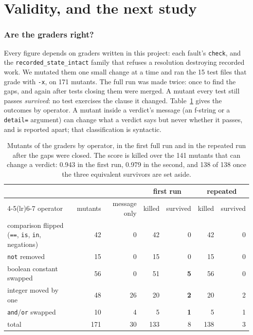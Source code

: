 \documentclass[11pt]{article}
\newcommand{\code}[1]{\texttt{#1}}
\begin{document}
\clearpage
\part{Validity, and the next study}

\section{Are the graders right?}
\label{sec:graders}

Every figure depends on graders written in this project: each fault's \code{check}, and the
\code{recorded\_state\_intact} family that refuses a resolution destroying recorded work. We
mutated them one small change at a time and ran the 15 test files that grade with \code{-x}, on
171 mutants. The full run was made twice: once to find the gaps, and again after tests closing
them were merged. A mutant every test still passes \emph{survived}: no test exercises the
clause it changed. Table~\ref{tab:mutation} gives the outcomes by operator. A mutant inside a
verdict's message (an f-string or a \code{detail=} argument) can change what a verdict says but
never whether it passes, and is reported apart; that classification is syntactic.

\begin{table}[t]
\centering
\caption{Mutants of the graders by operator, in the first full run and in the repeated run after
the gaps were closed. The score is killed over the 141 mutants that can change a verdict: 0.943
in the first run, 0.979 in the second, and 138 of 138 once the three equivalent survivors are set
aside.}
\label{tab:mutation}
\small
\setlength{\tabcolsep}{4pt}
\begin{tabular}{lrrrrrr}
\toprule
& & & \multicolumn{2}{c}{first run} & \multicolumn{2}{c}{repeated} \\
\cmidrule(lr){4-5}\cmidrule(lr){6-7}
operator & mutants & message only & killed & survived & killed & survived \\
\midrule
comparison flipped (\code{==}, \code{is}, \code{in}, negations) & 42 & 0 & 42 & 0 & 42 & 0 \\
\code{not} removed & 15 & 0 & 15 & 0 & 15 & 0 \\
boolean constant swapped & 56 & 0 & 51 & \textbf{5} & 56 & 0 \\
integer moved by one & 48 & 26 & 20 & \textbf{2} & 20 & 2 \\
\code{and}/\code{or} swapped & 10 & 4 & 5 & \textbf{1} & 5 & 1 \\
\midrule
total & 171 & 30 & 133 & 8 & 138 & 3 \\
\bottomrule
\end{tabular}
\end{table}
\end{document}

